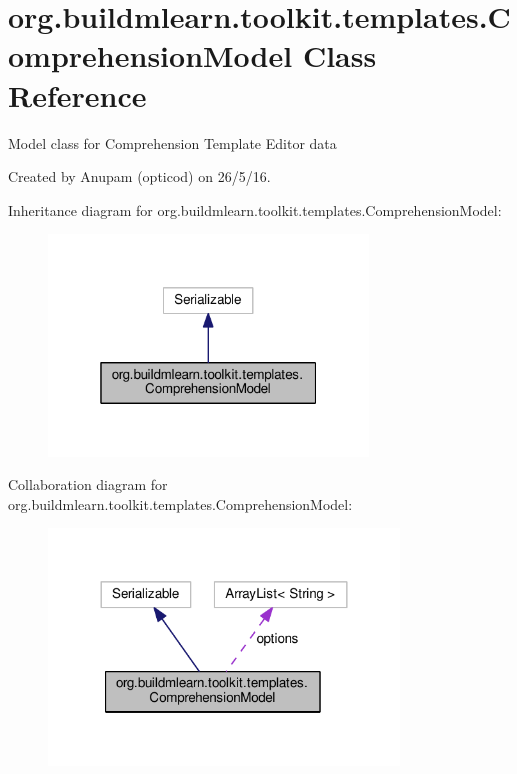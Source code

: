 \hypertarget{classorg_1_1buildmlearn_1_1toolkit_1_1templates_1_1ComprehensionModel}{}\section{org.\+buildmlearn.\+toolkit.\+templates.\+Comprehension\+Model Class Reference}
\label{classorg_1_1buildmlearn_1_1toolkit_1_1templates_1_1ComprehensionModel}


Model class for Comprehension Template Editor data 

Created by Anupam (opticod) on 26/5/16.  




Inheritance diagram for org.\+buildmlearn.\+toolkit.\+templates.\+Comprehension\+Model\+:
\nopagebreak
\begin{figure}[H]
\begin{center}
\leavevmode
\includegraphics[width=241pt]{classorg_1_1buildmlearn_1_1toolkit_1_1templates_1_1ComprehensionModel__inherit__graph}
\end{center}
\end{figure}


Collaboration diagram for org.\+buildmlearn.\+toolkit.\+templates.\+Comprehension\+Model\+:
\nopagebreak
\begin{figure}[H]
\begin{center}
\leavevmode
\includegraphics[width=264pt]{classorg_1_1buildmlearn_1_1toolkit_1_1templates_1_1ComprehensionModel__coll__graph}
\end{center}
\end{figure}
